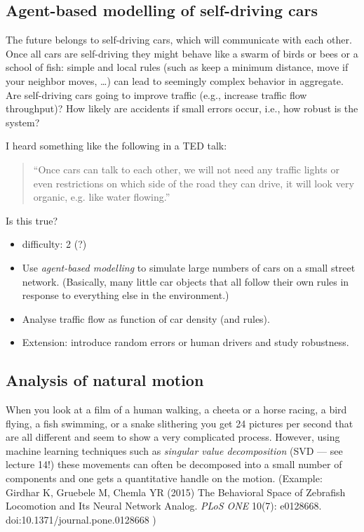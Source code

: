 \documentclass[letterpaper]{scrartcl}
\begin{document}
\subsection{Agent-based modelling of self-driving cars}
\label{sec:cars}

The future belongs to self-driving cars, which will communicate with
each other. Once all cars are self-driving they might behave like a
swarm of birds or bees or a school of fish: simple and local rules
(such as keep a minimum distance, move if your neighbor moves, \dots)
can lead to seemingly complex behavior in aggregate. Are self-driving
cars going to improve traffic (e.g., increase traffic flow
throughput)? How likely are accidents if small errors occur, i.e., how
robust is the system?

I heard something like the following in a TED talk:
\begin{quotation}
  ``Once cars can talk to each other, we will not need any traffic
  lights or even restrictions on which side of the road they can
  drive, it will look very organic, e.g. like water flowing.''
\end{quotation}
Is this true?

\begin{itemize}
\item difficulty: 2 (?)
\item Use \emph{agent-based modelling} to simulate large numbers of
  cars on a small street network. (Basically, many little car objects
  that all follow their own rules in response to everything else in
  the environment.)
\item Analyse traffic flow as function of car density (and rules).
\item Extension: introduce random errors or human drivers and study
  robustness.
\end{itemize}

\subsection{Analysis of natural motion}
\label{sec:motion}

When you look at a film of a human walking, a cheeta or a horse
racing, a bird flying, a fish swimming, or a snake slithering you get
24 pictures per second that are all different and seem to show a very
complicated process. However, using machine learning techniques such
as \emph{singular value decomposition} (SVD --- see lecture 14!) these
movements can often be decomposed into a small number of components and
one gets a quantitative handle on the motion. (Example: Girdhar K,
Gruebele M, Chemla YR (2015) The Behavioral Space of Zebrafish
Locomotion and Its Neural Network Analog. \emph{PLoS ONE} 10(7):
e0128668. doi:10.1371/journal.pone.0128668 )
\end{document}
